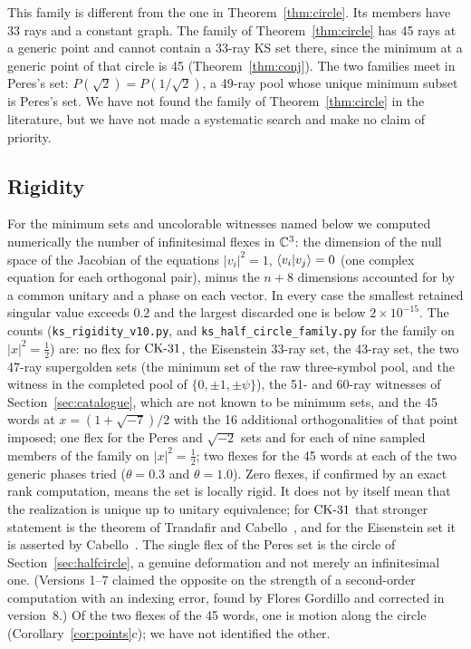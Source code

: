 This family is different from the one in Theorem~\ref{thm:circle}.  Its members have 33 rays
and a constant graph.  The family of Theorem~\ref{thm:circle} has 45 rays at a generic point and
cannot contain a 33-ray KS set there, since the minimum at a generic point of that circle is 45
(Theorem~\ref{thm:conj}).  The two families meet in Peres's set: $P(\sqrt2)=P(1/\sqrt2)$, a
49-ray pool whose unique minimum subset is Peres's set.  We
have not found the family of Theorem~\ref{thm:circle} in the literature, but we have not made a
systematic search and make no claim of priority.

\subsection{Rigidity}\label{sec:rigidity}

For the minimum sets and uncolorable witnesses named below we computed numerically the number
of infinitesimal flexes in $\mathbb{C}^3$: the
dimension of the null space of the Jacobian of the equations $|v_i|^2=1$,
$\langle v_i|v_j\rangle=0$ (one complex equation for each orthogonal pair), minus the $n+8$
dimensions accounted for by a common unitary and a phase on each vector.  In every case the
smallest retained singular value exceeds $0.2$ and the largest discarded one is below
$2\times10^{-15}$.  The counts (\texttt{ks\_rigidity\_v10.py}, and
\texttt{ks\_half\_circle\_family.py} for the family on $|x|^2=\tfrac12$) are: no flex for $\mathrm{CK}\text{-}31$,
the Eisenstein 33-ray set, the 43-ray set, the two 47-ray supergolden sets (the minimum set of
the raw three-symbol pool, and the witness in the completed pool of $\{0,\pm1,\pm\psi\}$), the
51- and 60-ray witnesses of Section~\ref{sec:catalogue}, which are not known to be minimum sets,
and the 45 words at $x=(1+\sqrt{-7})/2$ with the 16 additional
orthogonalities of that point imposed; one flex for the Peres and $\sqrt{-2}$ sets and for each
of nine sampled members of the family on $|x|^2=\tfrac12$; two flexes for the 45 words at each
of the two generic phases tried ($\theta=0.3$ and $\theta=1.0$).  Zero flexes, if confirmed by
an exact rank computation, means the set is locally rigid.  It does not by itself mean that the
realization is unique up to unitary equivalence; for $\mathrm{CK}\text{-}31$ that stronger statement is the
theorem of Trandafir and Cabello~\cite{TrandafirCabello2025}, and for the Eisenstein set it is
asserted by Cabello~\cite{Cabello2025simplest}.  The single flex of the Peres set is the circle
of Section~\ref{sec:halfcircle}, a genuine deformation and not merely an infinitesimal one.
(Versions 1--7 claimed the opposite on the strength of a second-order computation with an
indexing error, found by Flores Gordillo and corrected in version~8.)  Of the two flexes of the
45 words, one is motion along the circle (Corollary~\ref{cor:points}c); we have not identified
the other.
